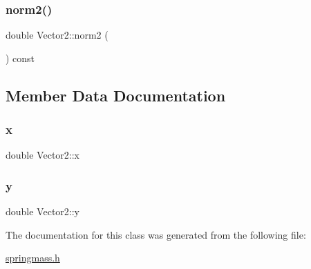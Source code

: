 \mbox{\label{classVector2_a08452f15b4693e07c992b77053b24d89}} 
\subsubsection{\texorpdfstring{norm2()}{norm2()}}
{\footnotesize\ttfamily double Vector2\+::norm2 (\begin{DoxyParamCaption}{ }\end{DoxyParamCaption}) const\hspace{0.3cm}{\ttfamily [inline]}}



\subsection{Member Data Documentation}
\mbox{\label{classVector2_a61d73d9036ccbb3257fbe595c014a1d0}} 
\subsubsection{\texorpdfstring{x}{x}}
{\footnotesize\ttfamily double Vector2\+::x}

\mbox{\label{classVector2_a4df9b2a8e79e6e30a7a3b34722d8b8b8}} 
\subsubsection{\texorpdfstring{y}{y}}
{\footnotesize\ttfamily double Vector2\+::y}



The documentation for this class was generated from the following file\+:\begin{DoxyCompactItemize}
\item 
\hyperlink{springmass_8h}{springmass.\+h}\end{DoxyCompactItemize}
